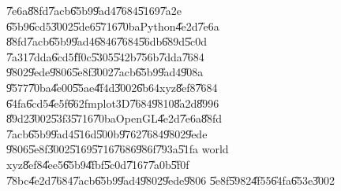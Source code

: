 \begin{figure}[th]
\caption{\U{7e6a}\U{88fd}\U{7acb}\U{65b9}\U{9ad4}\U{7684}\U{5169}\U{7a2e}%
\U{65b9}\U{6cd5}\U{3002}\U{5de6}\U{5716}\U{70ba}Python\U{4e2d}\U{7e6a}%
\U{88fd}\U{7acb}\U{65b9}\U{9ad4}\U{6846}\U{7684}\U{56db}\U{689d}\U{5c0d}%
\U{7a31}\U{7dda}\U{6cd5}\U{ff0c}\U{5305}\U{542b}\U{756b}\U{7dda}\U{7684}%
\U{9802}\U{9ede}\U{9806}\U{5e8f}\U{3002}\U{7acb}\U{65b9}\U{9ad4}\U{908a}%
\U{9577}\U{70ba}\U{4e00}\U{55ae}\U{4f4d}\U{3002}\U{6b64}xyz\U{8ef8}\U{7684}%
\U{64fa}\U{6cd5}\U{4e5f}\U{662f}mplot3D\U{7684}\U{9810}\U{8a2d}\U{8996}%
\U{89d2}\U{3002}\U{53f3}\U{5716}\U{70ba}OpenGL\U{4e2d}\U{7e6a}\U{88fd}%
\U{7acb}\U{65b9}\U{9ad4}\U{516d}\U{500b}\U{9762}\U{7684}\U{9802}\U{9ede}%
\U{9806}\U{5e8f}\U{3002}\U{5169}\U{5716}\U{7686}\U{986f}\U{793a}\U{51fa}%
world xyz\U{8ef8}\U{4ee5}\U{65b9}\U{4fbf}\U{5c0d}\U{7167}\U{7a0b}\U{5f0f}%
\U{78bc}\U{4e2d}\U{7684}\U{7acb}\U{65b9}\U{9ad4}\U{9802}\U{9ede}\U{9806}%
\U{5e8f}\U{5982}\U{4f55}\U{64fa}\U{653e}\U{3002}}
\begin{center}
\end{center}
\end{figure}
